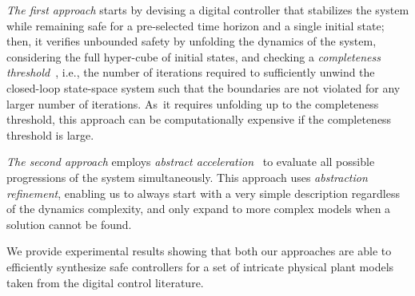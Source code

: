 \documentclass[submission]{eptcs}
\begin{document}
\emph{The first approach} starts by devising a
digital controller that stabilizes the system while remaining safe for a
pre-selected time horizon and a single initial state; then, it verifies
unbounded safety by unfolding the dynamics of the system, considering the
full hyper-cube of initial states, and checking a \emph{completeness
threshold}~\cite{DBLP:conf/vmcai/KroeningS03}, i.e., the number of
iterations required to sufficiently unwind the closed-loop state-space
system such that the boundaries are not violated for any larger number of
iterations.  As~it requires unfolding up to the completeness threshold, this
approach can be computationally expensive if the completeness threshold is large.

\emph{The second approach}
employs \emph{abstract acceleration}~\cite{cattaruzza2015unbounded} to
evaluate all possible progressions of the system simultaneously. 
This approach uses \emph{abstraction refinement},
enabling us to always start with a very simple description regardless of the
dynamics complexity, and only expand to more complex models
when a solution cannot be found.

We provide experimental results showing that both our approaches are able to
efficiently synthesize safe controllers for a set of intricate physical
plant models taken from the digital control literature.

       
  
\end{document}
